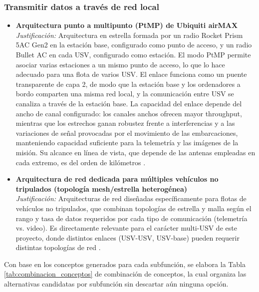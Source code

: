 \subsubsection*{Transmitir datos a través de red local}
\begin{itemize}
  \item \textbf{Arquitectura punto a multipunto (PtMP) de Ubiquiti airMAX} \\
  \textit{Justificación:} Arquitectura en estrella formada por un radio Rocket Prism 5AC Gen2 
  en la estación base, configurado como punto de acceso, y un radio Bullet AC en cada USV, 
  configurado como estación. El modo PtMP permite asociar varias estaciones a un mismo punto de 
  acceso, lo que lo hace adecuado para una flota de varios USV. El enlace funciona como un puente 
  transparente de capa 2, de modo que la estación base y los ordenadores a bordo comparten 
  una misma red local, y la comunicación entre USV se canaliza a través de la estación base. La 
  capacidad del enlace depende del ancho de canal configurado: los canales anchos ofrecen mayor 
  throughput, mientras que los estrechos ganan robustez frente a interferencias y a las 
  variaciones de señal provocadas por el movimiento de las embarcaciones, manteniendo capacidad 
  suficiente para la telemetría y las imágenes de la misión. Su alcance en línea de vista, que 
  depende de las antenas empleadas en cada extremo, es del orden de kilómetros \cite{Cite25}. \\


  \item \textbf{Arquitectura de red dedicada para múltiples vehículos no tripulados (topología mesh/estrella heterogénea)} \\
  \textit{Justificación:} Arquitecturas de red diseñadas específicamente para flotas de vehículos no 
  tripulados, que combinan topologías de estrella y malla según el rango y tasa de datos requeridos por 
  cada tipo de comunicación (telemetría vs. video). Es directamente relevante para el carácter multi-USV 
  de este proyecto, donde distintos enlaces (USV-USV, USV-base) pueden requerir distintas topologías de 
  red \cite{Cite26}. \\

\end{itemize}

\newpage

Con base en los conceptos generados para cada subfunción, se elabora la Tabla 
\ref{tab:combinacion_conceptos} de combinación de conceptos, la cual organiza las alternativas 
candidatas por subfunción sin descartar aún ninguna opción. 



